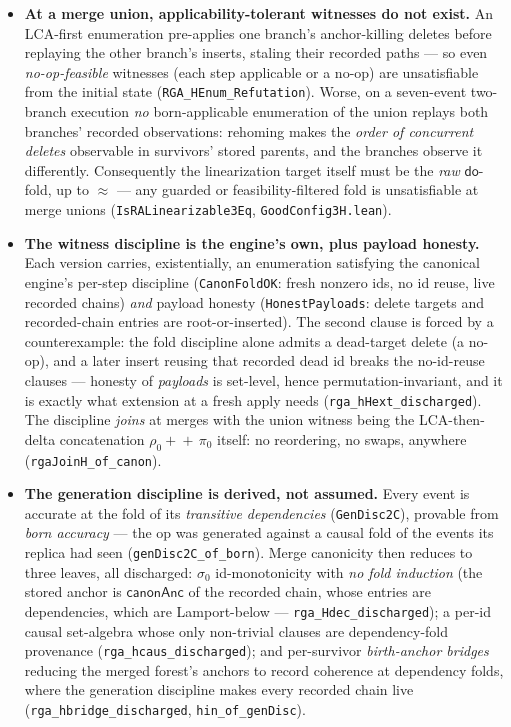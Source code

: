 \documentclass[11pt]{article}
\theoremstyle{definition}
\theoremstyle{remark}
\newcommand{\dodo}{\mathsf{do}}
\newcommand{\eqobs}{\approx}
\newcommand{\lean}[1]{\texttt{#1}}
\begin{document}
\begin{itemize}[nosep]
  \item \textbf{At a merge union, applicability-tolerant witnesses do not exist.} An
  LCA-first enumeration pre-applies one branch's anchor-killing deletes before replaying the
  other branch's inserts, staling their recorded paths --- so even \emph{no-op-feasible}
  witnesses (each step applicable or a no-op) are unsatisfiable from the initial state
  (\lean{RGA\_HEnum\_Refutation}). Worse, on a seven-event two-branch execution \emph{no}
  born-applicable enumeration of the union replays both branches' recorded observations:
  rehoming makes the \emph{order of concurrent deletes} observable in survivors' stored
  parents, and the branches observe it differently. Consequently the linearization target
  itself must be the \emph{raw} $\dodo$-fold, up to $\eqobs$ --- any guarded or
  feasibility-filtered fold is unsatisfiable at merge unions
  (\lean{IsRALinearizable3Eq}, \lean{GoodConfig3H.lean}).
  \item \textbf{The witness discipline is the engine's own, plus payload honesty.} Each
  version carries, existentially, an enumeration satisfying the canonical engine's per-step
  discipline (\lean{CanonFoldOK}: fresh nonzero ids, no id reuse, live recorded chains)
  \emph{and} payload honesty (\lean{HonestPayloads}: delete targets and recorded-chain
  entries are root-or-inserted). The second clause is forced by a counterexample: the fold
  discipline alone admits a dead-target delete (a no-op), and a later insert reusing that
  recorded dead id breaks the no-id-reuse clauses --- honesty of \emph{payloads} is
  set-level, hence permutation-invariant, and it is exactly what extension at a fresh apply
  needs (\lean{rga\_hHext\_discharged}). The discipline \emph{joins} at merges with the
  union witness being the LCA-then-delta concatenation $\rho_0 +\!\!+\, \pi_0$ itself:
  no reordering, no swaps, anywhere (\lean{rgaJoinH\_of\_canon}).
  \item \textbf{The generation discipline is derived, not assumed.} Every event is
  accurate at the fold of its \emph{transitive dependencies} (\lean{GenDisc2C}), provable
  from \emph{born accuracy} --- the op was generated against a causal fold of the events its
  replica had seen (\lean{genDisc2C\_of\_born}). Merge canonicity then reduces to three
  leaves, all discharged: $\sigma_0$ id-monotonicity with \emph{no fold induction} (the
  stored anchor is $\mathsf{canonAnc}$ of the recorded chain, whose entries are
  dependencies, which are Lamport-below --- \lean{rga\_Hdec\_discharged}); a per-id causal
  set-algebra whose only non-trivial clauses are dependency-fold provenance
  (\lean{rga\_hcaus\_discharged}); and per-survivor \emph{birth-anchor bridges} reducing
  the merged forest's anchors to record coherence at dependency folds, where the generation
  discipline makes every recorded chain live
  (\lean{rga\_hbridge\_discharged}, \lean{hin\_of\_genDisc}).
\end{itemize}
\end{document}
